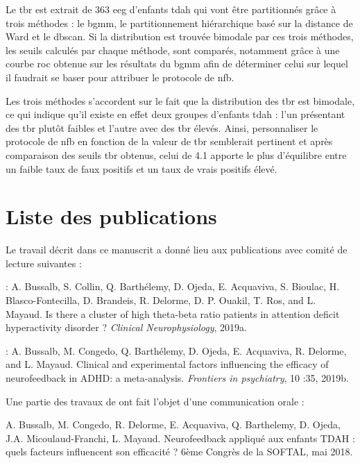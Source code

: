 Le \gls{tbr} est extrait de 363 \gls{eeg} d'enfants \gls{tdah} qui vont être partitionnés grâce à trois méthodes : le \gls{bgmm}, le partitionnement
hiérarchique basé sur la distance de Ward et le \gls{dbscan}. Si la distribution est trouvée bimodale par ces trois méthodes, les seuils calculés par chaque méthode,
sont comparés, notamment grâce à une courbe \gls{roc} obtenue sur
les résultats du \gls{bgmm} afin de déterminer celui sur lequel il faudrait se baser pour attribuer le protocole de \gls{nfb}.

Les trois méthodes s'accordent sur le fait que la distribution des \gls{tbr} est bimodale, ce qui indique qu'il existe en effet deux groupes d'enfants
\gls{tdah} : l'un présentant des \gls{tbr} plutôt faibles et l'autre avec des \gls{tbr} élevés. Ainsi, personnaliser le protocole de \gls{nfb} en 
fonction de la valeur de \gls{tbr} semblerait pertinent et après comparaison des seuils \gls{tbr} obtenus, celui de 4.1 apporte le plus d'équilibre entre 
un faible taux de faux positifs et un taux de vrais positifs élevé.  

\section{Liste des publications}

Le travail décrit dans ce manuscrit a donné lieu aux publications avec comité de lecture suivantes :

\begin{description}
\item \citet{Bussalb2019tbr} : A. Bussalb, S. Collin, Q. Barthélemy, D. Ojeda, E. Acquaviva, S. Bioulac, H. Blasco-Fontecilla,
D. Brandeis, R. Delorme, D. P. Ouakil, T. Ros, and L. Mayaud. Is there a cluster of high
theta-beta ratio patients in attention deficit hyperactivity disorder ? \textit{Clinical Neurophysiology}, 2019a.
\item \citet{Bussalb2019clinical} : A. Bussalb, M. Congedo, Q. Barthélemy, D. Ojeda, E. Acquaviva, R. Delorme,
and L. Mayaud. Clinical and experimental factors influencing the efficacy of
neurofeedback in ADHD: a meta-analysis. \textit{Frontiers in psychiatry}, 10 :35, 2019b.
\end{description}

Une partie des travaux de \citet{Bussalb2019clinical} ont fait l'objet d'une communication orale :

\noindent A. Bussalb, M. Congedo, R. Delorme, E. Acquaviva, Q. Barthelemy, D. Ojeda, J.A. Micoulaud-Franchi, L. Mayaud. Neurofeedback 
appliqué aux enfants TDAH : quels facteurs influencent son efficacité ? 6ème Congrès de la SOFTAL, mai 2018. 


